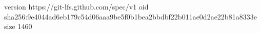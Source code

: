 version https://git-lfs.github.com/spec/v1
oid sha256:9e4044ad6eb179c54d06aaa9be5f0b1bea2bbdbf22b011ae0d2ae22b81a8333e
size 1460

